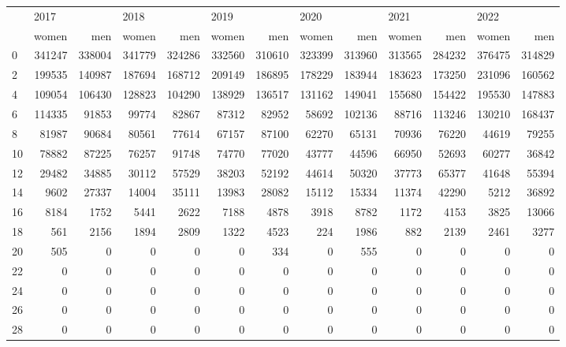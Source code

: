 \begin{tabular}{lrrrrrrrrrrrr}
\toprule
{} & \multicolumn{2}{l}{2017} & \multicolumn{2}{l}{2018} & \multicolumn{2}{l}{2019} & \multicolumn{2}{l}{2020} & \multicolumn{2}{l}{2021} & \multicolumn{2}{l}{2022} \\
{} &   women &     men &   women &     men &   women &     men &   women &     men &   women &     men &   women &     men \\
\midrule
0  &  341247 &  338004 &  341779 &  324286 &  332560 &  310610 &  323399 &  313960 &  313565 &  284232 &  376475 &  314829 \\
2  &  199535 &  140987 &  187694 &  168712 &  209149 &  186895 &  178229 &  183944 &  183623 &  173250 &  231096 &  160562 \\
4  &  109054 &  106430 &  128823 &  104290 &  138929 &  136517 &  131162 &  149041 &  155680 &  154422 &  195530 &  147883 \\
6  &  114335 &   91853 &   99774 &   82867 &   87312 &   82952 &   58692 &  102136 &   88716 &  113246 &  130210 &  168437 \\
8  &   81987 &   90684 &   80561 &   77614 &   67157 &   87100 &   62270 &   65131 &   70936 &   76220 &   44619 &   79255 \\
10 &   78882 &   87225 &   76257 &   91748 &   74770 &   77020 &   43777 &   44596 &   66950 &   52693 &   60277 &   36842 \\
12 &   29482 &   34885 &   30112 &   57529 &   38203 &   52192 &   44614 &   50320 &   37773 &   65377 &   41648 &   55394 \\
14 &    9602 &   27337 &   14004 &   35111 &   13983 &   28082 &   15112 &   15334 &   11374 &   42290 &    5212 &   36892 \\
16 &    8184 &    1752 &    5441 &    2622 &    7188 &    4878 &    3918 &    8782 &    1172 &    4153 &    3825 &   13066 \\
18 &     561 &    2156 &    1894 &    2809 &    1322 &    4523 &     224 &    1986 &     882 &    2139 &    2461 &    3277 \\
20 &     505 &       0 &       0 &       0 &       0 &     334 &       0 &     555 &       0 &       0 &       0 &       0 \\
22 &       0 &       0 &       0 &       0 &       0 &       0 &       0 &       0 &       0 &       0 &       0 &       0 \\
24 &       0 &       0 &       0 &       0 &       0 &       0 &       0 &       0 &       0 &       0 &       0 &       0 \\
26 &       0 &       0 &       0 &       0 &       0 &       0 &       0 &       0 &       0 &       0 &       0 &       0 \\
28 &       0 &       0 &       0 &       0 &       0 &       0 &       0 &       0 &       0 &       0 &       0 &       0 \\
\bottomrule
\end{tabular}
